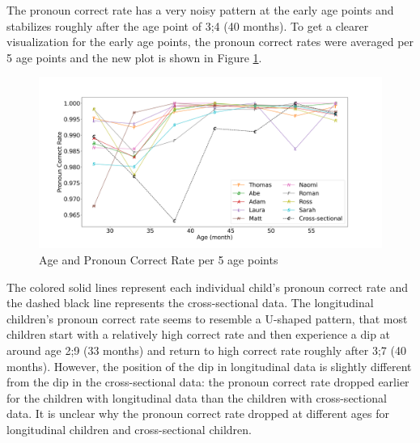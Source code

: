 The pronoun correct rate has a very noisy pattern at the early age points and stabilizes roughly after the age point of 3;4 (40 months). To get a clearer visualization for the early age points, the pronoun correct rates were averaged per 5 age points and the new plot is shown in Figure \ref{fig:2}.
\FloatBarrier
\begin{figure}[h]
\includegraphics[scale = 0.35, width = \linewidth]{graph/Age5month.png}
\vspace{-2em}
\caption{Age and Pronoun Correct Rate per 5 age points}
\label{fig:2}
\end{figure}
\FloatBarrier
The colored solid lines represent each individual child's pronoun correct rate and the dashed black line represents the cross-sectional data. The longitudinal children's pronoun correct rate seems to resemble a U-shaped pattern, that most children start with a relatively high correct rate and then experience a dip at around age 2;9 (33 months) and return to high correct rate roughly after 3;7 (40 months). However, the position of the dip in longitudinal data is slightly different from the dip in the cross-sectional data: the pronoun correct rate dropped earlier for the children with longitudinal data than the children with cross-sectional data. It is unclear why the pronoun correct rate dropped at different ages for longitudinal children and cross-sectional children. 

